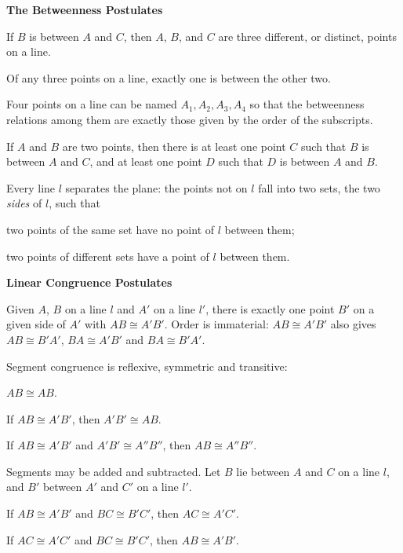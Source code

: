 \documentclass[11pt]{book}
\newcommand{\APPsub}[1]{%
  \par\medskip\begin{center}\bfseries\small #1\end{center}\par\nopagebreak}
\begin{document}
\APPsub{The Betweenness Postulates}

\begin{applist}[resume]
\item If $B$ is between $A$ and $C$, then $A$, $B$, and $C$ are three
      different, or distinct, points on a line.
\item Of any three points on a line, exactly one is between the other two.
\item Four points on a line can be named $A_1, A_2, A_3, A_4$ so that the
      betweenness relations among them are exactly those given by the order
      of the subscripts.
\item If $A$ and $B$ are two points, then there is at least one point $C$
      such that $B$ is between $A$ and $C$, and at least one point $D$ such
      that $D$ is between $A$ and $B$.
\item Every line $l$ separates the plane: the points not on $l$ fall into
      two sets, the two \emph{sides} of $l$, such that
      \begin{applist}
      \item two points of the same set have no point of $l$ between them;
      \item two points of different sets have a point of $l$ between them.
      \end{applist}
\end{applist}

\APPsub{Linear Congruence Postulates}

\begin{applist}[resume]
\item Given $A$, $B$ on a line $l$ and $A'$ on a line $l'$, there is exactly
      one point $B'$ on a given side of $A'$ with $AB \cong A'B'$. Order is
      immaterial: $AB \cong A'B'$ also gives $AB \cong B'A'$,
      $BA \cong A'B'$ and $BA \cong B'A'$.
\item Segment congruence is reflexive, symmetric and transitive:
      \begin{applist}
      \item $AB \cong AB$.
      \item If $AB \cong A'B'$, then $A'B' \cong AB$.
      \item If $AB \cong A'B'$ and $A'B' \cong A''B''$, then
            $AB \cong A''B''$.
      \end{applist}
\item Segments may be added and subtracted. Let $B$ lie between $A$ and $C$
      on a line $l$, and $B'$ between $A'$ and $C'$ on a line $l'$.
      \begin{applist}
      \item If $AB \cong A'B'$ and $BC \cong B'C'$, then $AC \cong A'C'$.
      \item If $AC \cong A'C'$ and $BC \cong B'C'$, then $AB \cong A'B'$.
      \end{applist}
\end{applist}
\end{document}
